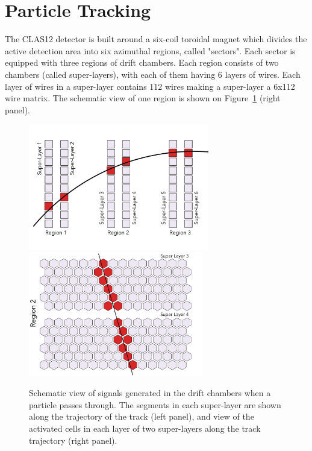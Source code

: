 \section{Particle Tracking}

The CLAS12\cite{Burkert:2020akg} detector is built around a six-coil toroidal magnet which divides the active detection area into six azimuthal regions, called "sectors". Each sector is equipped with three regions of drift chambers. Each region consists of two chambers (called super-layers), with each of them having 6 layers of wires. Each layer of wires in a super-layer contains 112 wires making a super-layer a 6x112 wire matrix. The schematic view of one region  is shown on Figure~\ref{dc:side_view} (right panel).

\begin{figure}[!ht]
\begin{center}
 \includegraphics[width=3.1in]{images/dc_diagram.pdf}
 \includegraphics[width=3in]{images/region_2_diagram.pdf}
\caption {Schematic view of signals generated in the drift chambers when a particle passes through. The segments in each super-layer are shown along the trajectory of the track (left panel), and view of the activated cells in each layer of two super-layers along the track trajectory (right panel).}
 \label{dc:side_view}
 \end{center}
\end{figure}

